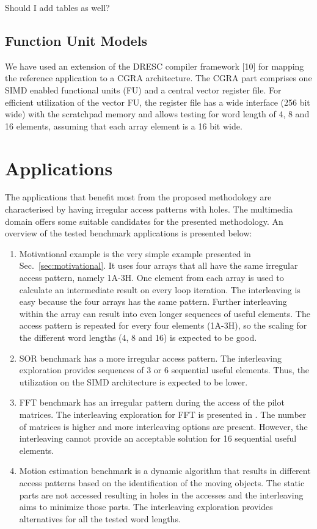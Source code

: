 \documentclass[prodmode,acmtodaes]{acmsmall}
\begin{document}
Should I add tables as well?

\subsection{Function Unit Models}

We have used an extension of the DRESC compiler framework [10] for mapping the reference application to a CGRA architecture.
The CGRA part comprises one SIMD enabled functional units (FU) and a central vector register file. 
For efficient utilization of the vector FU, the register file has a wide interface (256 bit wide) with the scratchpad memory and allows testing for word length of 4, 8 and 16 elements, assuming that each array element is a 16 bit wide.  

\section{Applications}
\label{sec:applications}

The applications that benefit most from the proposed methodology are characterised by having irregular access patterns with holes.
The multimedia domain offers some suitable candidates for the presented methodology.
An overview of the tested benchmark applications is presented below:

\begin{enumerate}
\item Motivational example is the very simple example presented in Sec.~\ref{sec:motivational}. 
It uses four arrays that all have the same irregular access pattern, namely 1A-3H.
One element from each array is used to calculate an intermediate result on every loop iteration.
The interleaving is easy because the four arrays has the same pattern.
Further interleaving within the array can result into even longer sequences of useful elements.
The access pattern is repeated for every four elements (1A-3H), so the scaling for the different word lengths (4, 8 and 16) is expected to be good. 
\item SOR benchmark has a more irregular access pattern.
The interleaving exploration provides sequences of 3 or 6 sequential useful elements.
Thus, the utilization on the SIMD architecture is expected to be lower.
\item FFT benchmark has an irregular pattern during the access of the pilot matrices. 
The interleaving exploration for FFT is presented in \cite{sharma2013data}.
The number of matrices is higher and more interleaving options are present.
However, the interleaving cannot provide an acceptable solution for 16 sequential useful elements.
\item Motion estimation benchmark is a dynamic algorithm that results in different access patterns based on the identification of the moving objects. 
The static parts are not accessed resulting in holes in the accesses and the interleaving aims to minimize those parts.
The interleaving exploration provides alternatives for all the  tested word lengths. 
\end{enumerate}
\end{document}
